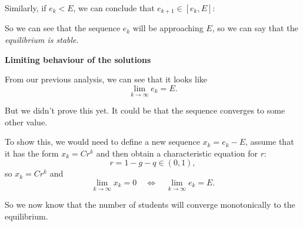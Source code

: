 Similarly, if $e_k < E$, we can conclude that $e_{k+1} \in [e_k,E]$:
\begin{center}
\end{center}


So we can see that the sequence $e_k$ will be approaching $E$, so we can say that the \emph{equilibrium is stable}.







\hfill

\begin{center}
\textbf{\color{cyan}
Limiting behaviour of the solutions
}
\end{center}



From our previous analysis, we can see that it looks like 
$$
\lim_{k \to \infty} e_k = E.
$$

But we didn't prove this yet. It could be that the sequence converges to some other value. 

To show this, we would need to define a new sequence $x_k = e_k-E$, assume that it has the form $x_k = C r^k$ and then obtain a characteristic equation for $r$:
$$
r = 1-g-q \in (0,1),
$$
so $x_k = C r^k$ and 
$$
\lim_{k \to \infty} x_k = 0
\quad \Leftrightarrow \quad
	\lim_{k \to \infty} e_k = E.
$$

So we now know that the number of students will converge monotonically to the equilibrium.







